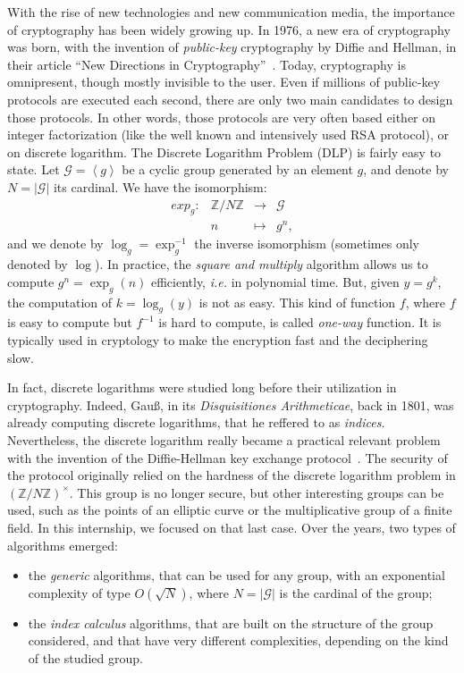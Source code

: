 \documentclass[a4paper,11pt]{article}
\theoremstyle{break}
\theoremstyle{sc}
\theoremstyle{definition}
\theoremstyle{remark}
\newcommand{\ie}{\emph{i.e. }}
\begin{document}
With the rise of new technologies and new communication media, the importance of
cryptography has been widely growing up. In 1976, a new era of cryptography was
born, with the invention of \emph{public-key} cryptography by Diffie and
Hellman, in their article ``New Directions in Cryptography''~\cite{DH76}. Today,
cryptography is omnipresent, though mostly invisible to the user. Even if
millions of public-key protocols are executed each second, there are only two
main candidates to design those protocols. In other words, those protocols are
very often based either on integer factorization (like the well known
and intensively used RSA protocol), or on discrete logarithm. The Discrete
Logarithm Problem (DLP) is fairly easy to state. Let $\mathcal G=\left\langle
g\right\rangle$ be a cyclic group generated by an element
$g$, and denote by $N=|\mathcal G|$ its cardinal. We have the isomorphism:
\[
 \begin{array}{cccc}
   exp_g: & \mathbb{Z}/N\mathbb{Z} & \to & \mathcal G \\
   & n & \mapsto & g^n,
 \end{array}
\]
and we denote by $\log_g=\exp_g^{-1}$ the inverse isomorphism (sometimes only
denoted by $\log$). In practice, the
\emph{square and multiply} algorithm allows us to compute $g^n=\exp_g(n)$
efficiently, \ie in polynomial time. But, given $y = g^k$, the computation of $k
= \log_g(y)$ is not as easy. This kind of function $f$, where $f$ is easy to
compute but $f^{-1}$ is hard to compute, is called \emph{one-way} function.
It is
typically used in cryptology to make the encryption fast and the deciphering
slow. 

In fact, discrete
logarithms were studied long before their utilization in cryptography. Indeed,
Gauß, in its \emph{Disquisitiones Arithmeticae}, back in 1801, was already
computing discrete logarithms, that he reffered to as \emph{indices}.
Nevertheless, the discrete logarithm really became a practical relevant problem
with the invention of the Diffie-Hellman key exchange protocol~\cite{DH76}. The
security of the protocol originally relied on the hardness of the discrete
logarithm problem in $(\mathbb{Z}/N\mathbb{Z})^\times$. This group is no longer
secure, but other interesting groups can be used, such as the points of an
elliptic curve or the multiplicative group of a finite field. In this
internship, we focused on that last case. Over the years, two
types of algorithms emerged:
\begin{itemize}
  \item the \emph{generic} algorithms, that can be used for any group, with an
    exponential complexity of type $O(\sqrt N)$, where $N=|\mathcal G|$ is the cardinal
    of the group;
  \item the \emph{index calculus} algorithms, that are built on the structure of
    the group considered, and that have very different complexities, depending
    on the kind of the studied group.
\end{itemize}
\end{document}
